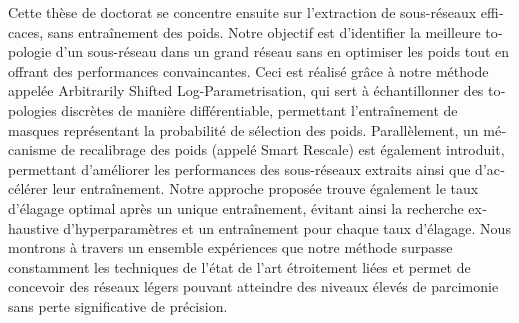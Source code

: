 \begin{otherlanguage}{french}
Cette thèse de doctorat se concentre ensuite sur l'extraction de sous-réseaux
efficaces, sans entraînement des poids. Notre objectif est d'identifier la
meilleure topologie d'un sous-réseau dans un grand réseau sans en optimiser les
poids tout en offrant des performances convaincantes. Ceci est réalisé grâce à
notre méthode appelée Arbitrarily Shifted Log-Parametrisation, qui sert à
échantillonner des topologies discrètes de manière différentiable, permettant
l'entraînement de masques représentant la probabilité de sélection des poids.
Parallèlement, un mécanisme de recalibrage des poids (appelé Smart Rescale) est
également introduit, permettant d'améliorer les performances des sous-réseaux
extraits ainsi que d'accélérer leur entraînement. Notre approche proposée trouve
également le taux d'élagage optimal après un unique entraînement, évitant ainsi
la recherche exhaustive d'hyperparamètres et un entraînement pour chaque taux
d'élagage. Nous montrons à travers un ensemble expériences que notre méthode
surpasse constamment les techniques de l'état de l'art étroitement liées et
permet de concevoir des réseaux légers pouvant atteindre des niveaux élevés de
parcimonie sans perte significative de précision.

\end{otherlanguage}